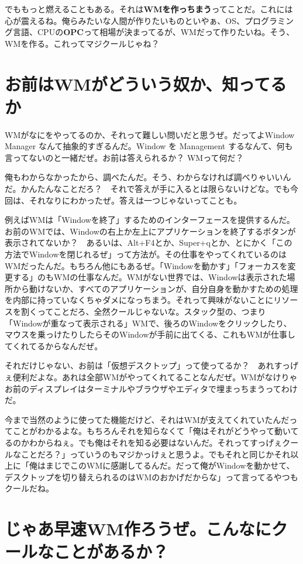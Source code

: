 \documentclass[12pt,a4paper]{jsarticle}
\begin{document}
 でももっと燃えることもある。それは\textbf{WMを作っちまう}ってことだ。これには心が震えるね。俺らみたいな人間が作りたいものといやぁ、OS、プログラミング言語、CPUの\textbf{OPC}って相場が決まってるが、WMだって作りたいね。そう、WMを作る。これってマジクールじゃね？
 
 
 \section{お前はWMがどういう奴か、知ってるか}
 
 WMがなにをやってるのか、それって難しい問いだと思うぜ。だってよWindow Manager なんて抽象的すぎるんだ。Window を Management するなんて、何も言ってないのと一緒だぜ。お前は答えられるか？ WMって何だ？

俺もわからなかったから、調べたんだ。そう、わからなければ調べりゃいいんだ。かんたんなことだろ？　それで答えが手に入るとは限らないけどな。でも今回は、それなりにわかったぜ。答えは一つじゃないってことも。

例えばWMは「Windowを終了」するためのインターフェースを提供するんだ。お前のWMでは、Windowの右上か左上にアプリケーションを終了するボタンが表示されてないか？　あるいは、Alt+F4とか、Super+qとか、とにかく「この方法でWindowを閉じれるぜ」って方法が。その仕事をやってくれているのはWMだったんだ。もちろん他にもあるぜ。「Windowを動かす」「フォーカスを変更する」のもWMの仕事なんだ。WMがない世界では、Windowは表示された場所から動けないか、すべてのアプリケーションが、自分自身を動かすための処理を内部に持っていなくちゃダメになっちまう。それって興味がないことにリソースを割くってことだろ、全然クールじゃないな。スタック型の、つまり「Windowが重なって表示される」WMで、後ろのWindowをクリックしたり、マウスを乗っけたりしたらそのWindowが手前に出てくる、これもWMが仕事してくれてるからなんだぜ。

それだけじゃない、お前は「仮想デスクトップ」って使ってるか？　あれすっげぇ便利だよな。あれは全部WMがやってくれてることなんだぜ。WMがなけりゃお前のディスプレイはターミナルやブラウザやエディタで埋まっちまうってわけだ。

今まで当然のように使ってた機能だけど、それはWMが支えてくれていたんだってことがわかるよな。もちろんそれを知らなくて「俺はそれがどうやって動いてるのかわからねぇ。でも俺はそれを知る必要はないんだ。それってすっげぇクールなことだろ？」っていうのもマジかっけぇと思うよ。でもそれと同じかそれ以上に「俺はまじでこのWMに感謝してるんだ。だって俺がWindowを動かせて、デスクトップを切り替えられるのはWMのおかげだからな」って言ってるやつもクールだね。

\section{じゃあ早速WM作ろうぜ。こんなにクールなことがあるか？}
\end{document}
